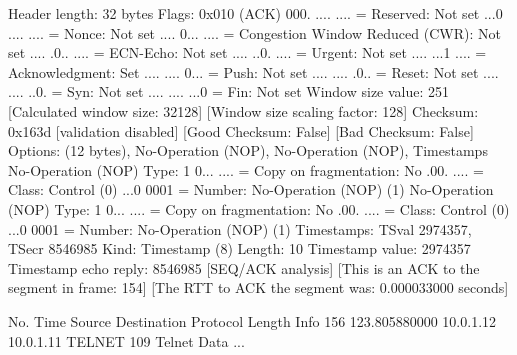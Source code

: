     Header length: 32 bytes
    Flags: 0x010 (ACK)
        000. .... .... = Reserved: Not set
        ...0 .... .... = Nonce: Not set
        .... 0... .... = Congestion Window Reduced (CWR): Not set
        .... .0.. .... = ECN-Echo: Not set
        .... ..0. .... = Urgent: Not set
        .... ...1 .... = Acknowledgment: Set
        .... .... 0... = Push: Not set
        .... .... .0.. = Reset: Not set
        .... .... ..0. = Syn: Not set
        .... .... ...0 = Fin: Not set
    Window size value: 251
    [Calculated window size: 32128]
    [Window size scaling factor: 128]
    Checksum: 0x163d [validation disabled]
        [Good Checksum: False]
        [Bad Checksum: False]
    Options: (12 bytes), No-Operation (NOP), No-Operation (NOP), Timestamps
        No-Operation (NOP)
            Type: 1
                0... .... = Copy on fragmentation: No
                .00. .... = Class: Control (0)
                ...0 0001 = Number: No-Operation (NOP) (1)
        No-Operation (NOP)
            Type: 1
                0... .... = Copy on fragmentation: No
                .00. .... = Class: Control (0)
                ...0 0001 = Number: No-Operation (NOP) (1)
        Timestamps: TSval 2974357, TSecr 8546985
            Kind: Timestamp (8)
            Length: 10
            Timestamp value: 2974357
            Timestamp echo reply: 8546985
    [SEQ/ACK analysis]
        [This is an ACK to the segment in frame: 154]
        [The RTT to ACK the segment was: 0.000033000 seconds]

No.     Time           Source                Destination           Protocol Length Info
    156 123.805880000  10.0.1.12             10.0.1.11             TELNET   109    Telnet Data ...

